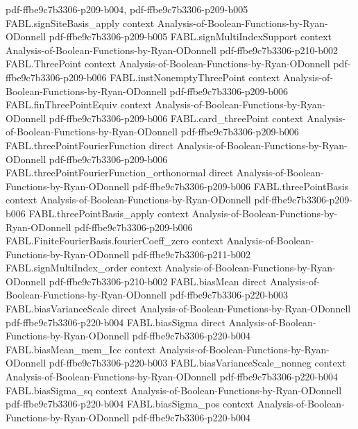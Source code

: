 \begin{theorem}
  {pdf-ffbe9c7b3306-p209-b004,
    pdf-ffbe9c7b3306-p209-b005}
\proofstep
  {FABL.signSiteBasis_apply}
  {context}
  {Analysis-of-Boolean-Functions-by-Ryan-ODonnell}
  {pdf-ffbe9c7b3306-p209-b005}
\proofstep
  {FABL.signMultiIndexSupport}
  {context}
  {Analysis-of-Boolean-Functions-by-Ryan-ODonnell}
  {pdf-ffbe9c7b3306-p210-b002}
\proofstep
  {FABL.ThreePoint}
  {context}
  {Analysis-of-Boolean-Functions-by-Ryan-ODonnell}
  {pdf-ffbe9c7b3306-p209-b006}
\proofstep
  {FABL.instNonemptyThreePoint}
  {context}
  {Analysis-of-Boolean-Functions-by-Ryan-ODonnell}
  {pdf-ffbe9c7b3306-p209-b006}
\proofstep
  {FABL.finThreePointEquiv}
  {context}
  {Analysis-of-Boolean-Functions-by-Ryan-ODonnell}
  {pdf-ffbe9c7b3306-p209-b006}
\proofstep
  {FABL.card_threePoint}
  {context}
  {Analysis-of-Boolean-Functions-by-Ryan-ODonnell}
  {pdf-ffbe9c7b3306-p209-b006}
\proofstep
  {FABL.threePointFourierFunction}
  {direct}
  {Analysis-of-Boolean-Functions-by-Ryan-ODonnell}
  {pdf-ffbe9c7b3306-p209-b006}
\proofstep
  {FABL.threePointFourierFunction_orthonormal}
  {direct}
  {Analysis-of-Boolean-Functions-by-Ryan-ODonnell}
  {pdf-ffbe9c7b3306-p209-b006}
\proofstep
  {FABL.threePointBasis}
  {context}
  {Analysis-of-Boolean-Functions-by-Ryan-ODonnell}
  {pdf-ffbe9c7b3306-p209-b006}
\proofstep
  {FABL.threePointBasis_apply}
  {context}
  {Analysis-of-Boolean-Functions-by-Ryan-ODonnell}
  {pdf-ffbe9c7b3306-p209-b006}
\proofstep
  {FABL.FiniteFourierBasis.fourierCoeff_zero}
  {context}
  {Analysis-of-Boolean-Functions-by-Ryan-ODonnell}
  {pdf-ffbe9c7b3306-p211-b002}
\proofstep
  {FABL.signMultiIndex_order}
  {context}
  {Analysis-of-Boolean-Functions-by-Ryan-ODonnell}
  {pdf-ffbe9c7b3306-p210-b002}
\proofstep
  {FABL.biasMean}
  {direct}
  {Analysis-of-Boolean-Functions-by-Ryan-ODonnell}
  {pdf-ffbe9c7b3306-p220-b003}
\proofstep
  {FABL.biasVarianceScale}
  {direct}
  {Analysis-of-Boolean-Functions-by-Ryan-ODonnell}
  {pdf-ffbe9c7b3306-p220-b004}
\proofstep
  {FABL.biasSigma}
  {direct}
  {Analysis-of-Boolean-Functions-by-Ryan-ODonnell}
  {pdf-ffbe9c7b3306-p220-b004}
\proofstep
  {FABL.biasMean_mem_Icc}
  {context}
  {Analysis-of-Boolean-Functions-by-Ryan-ODonnell}
  {pdf-ffbe9c7b3306-p220-b003}
\proofstep
  {FABL.biasVarianceScale_nonneg}
  {context}
  {Analysis-of-Boolean-Functions-by-Ryan-ODonnell}
  {pdf-ffbe9c7b3306-p220-b004}
\proofstep
  {FABL.biasSigma_sq}
  {context}
  {Analysis-of-Boolean-Functions-by-Ryan-ODonnell}
  {pdf-ffbe9c7b3306-p220-b004}
\proofstep
  {FABL.biasSigma_pos}
  {context}
  {Analysis-of-Boolean-Functions-by-Ryan-ODonnell}
  {pdf-ffbe9c7b3306-p220-b004}

\end{theorem}
